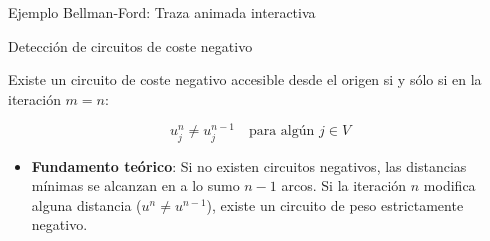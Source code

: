 \documentclass[
  ignorenonframetext,
]{beamer}
\providecommand{\tightlist}{%
  \setlength{\itemsep}{0pt}\setlength{\parskip}{0pt}}
\begin{document}
\begin{frame}{Ejemplo Bellman-Ford: Traza animada interactiva}
\label{ejemplo-bellman-ford-traza-animada-interactiva}
\end{frame}

\begin{frame}{Detección de circuitos de coste negativo}
\label{detecciuxf3n-de-circuitos-de-coste-negativo}
\begin{tcolorbox}[enhanced jigsaw, colframe=quarto-callout-important-color-frame, toptitle=1mm, colback=white, colbacktitle=quarto-callout-important-color!10!white, titlerule=0mm, breakable, coltitle=black, opacityback=0, bottomrule=.15mm, title=\textcolor{quarto-callout-important-color}{\faExclamation}\hspace{0.5em}{Criterio de detección de circuitos de coste negativo}, rightrule=.15mm, arc=.35mm, leftrule=.75mm, left=2mm, toprule=.15mm, bottomtitle=1mm, opacitybacktitle=0.6]

Existe un circuito de coste negativo accesible desde el origen si y sólo
si en la iteración \(m = n\):

\[u_j^n \neq u_j^{n-1} \quad \text{para algún } j \in V\]

\end{tcolorbox}

\begin{itemize}
\tightlist
\item
  \textbf{Fundamento teórico}: Si no existen circuitos negativos, las
  distancias mínimas se alcanzan en a lo sumo \(n-1\) arcos. Si la
  iteración \(n\) modifica alguna distancia (\(u^n \neq u^{n-1}\)),
  existe un circuito de peso estrictamente negativo.
\end{itemize}
\end{frame}
\end{document}
